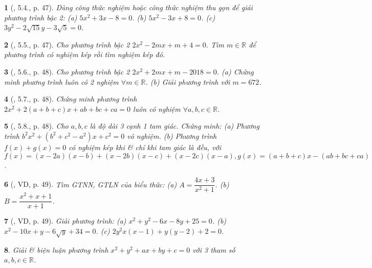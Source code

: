 \documentclass{article}
\newtheorem{baitoan}{}
\begin{document}
\begin{baitoan}[\cite{Binh_boi_duong_Toan_9_tap_2}, 5.4., p. 47]
	Dùng công thức nghiệm hoặc công thức nghiệm thu gọn để giải phương trình bậc 2: (a) $5x^2 + 3x - 8 = 0$. (b) $5x^2 - 3x + 8 = 0$. (c) $3y^2 - 2\sqrt{15}y - 3\sqrt{5} = 0$.
\end{baitoan}

\begin{baitoan}[\cite{Binh_boi_duong_Toan_9_tap_2}, 5.5., p. 47]
	Cho phương trình bậc 2 $2x^2 - 2mx + m + 4 = 0$. Tìm $m\in\mathbb{R}$ để phương trình có nghiệm kép rồi tìm nghiệm kép đó.
\end{baitoan}

\begin{baitoan}[\cite{Binh_boi_duong_Toan_9_tap_2}, 5.6., p. 48]
	Cho phương trình bậc 2 $2x^2 + 2mx + m - 2018 = 0$. (a) Chứng minh phương trình luôn có 2 nghiệm $\forall m\in\mathbb{R}$. (b) Giải phương trình với $m = 672$.
\end{baitoan}

\begin{baitoan}[\cite{Binh_boi_duong_Toan_9_tap_2}, 5.7., p. 48]
	Chứng minh phương trình $2x^2 + 2(a + b + c)x + ab + bc + ca = 0$ luôn có nghiệm $\forall a,b,c\in\mathbb{R}$.
\end{baitoan}

\begin{baitoan}[\cite{Binh_boi_duong_Toan_9_tap_2}, 5.8., p. 48]
	Cho $a,b,c$ là độ dài 3 cạnh 1 tam giác. Chứng minh: (a) Phương trình $b^2x^2 + (b^2 + c^2 - a^2)x + c^2 = 0$ vô nghiệm. (b) Phương trình $f(x) + g(x) = 0$ có nghiệm kép khi \& chỉ khi tam giác là đều, với $f(x) = (x - 2a)(x - b) + (x - 2b)(x - c) + (x - 2c)(x - a),g(x) = (a + b + c)x - (ab + bc + ca)$.
\end{baitoan}

\begin{baitoan}[\cite{Binh_boi_duong_Toan_9_tap_2}, VD, p. 49]
	Tìm {\rm GTNN, GTLN} của biểu thức: (a) $A = \dfrac{4x + 3}{x^2 + 1}$. (b) $B = \dfrac{x^2 + x + 1}{x + 1}$.
\end{baitoan}

\begin{baitoan}[\cite{Binh_boi_duong_Toan_9_tap_2}, VD, p. 49]
	Giải phương trình: (a) $x^2 + y^2 - 6x - 8y + 25 = 0$. (b) $x^2 - 10x + y - 6\sqrt{y} + 34 = 0$. (c) $2y^2x(x - 1) + y(y - 2) + 2 = 0$.
\end{baitoan}

\begin{baitoan}
	Giải \& biện luận phương trình $x^2 + y^2 + ax + by + c = 0$ với 3 tham số $a,b,c\in\mathbb{R}$.
\end{baitoan}
\end{document}
